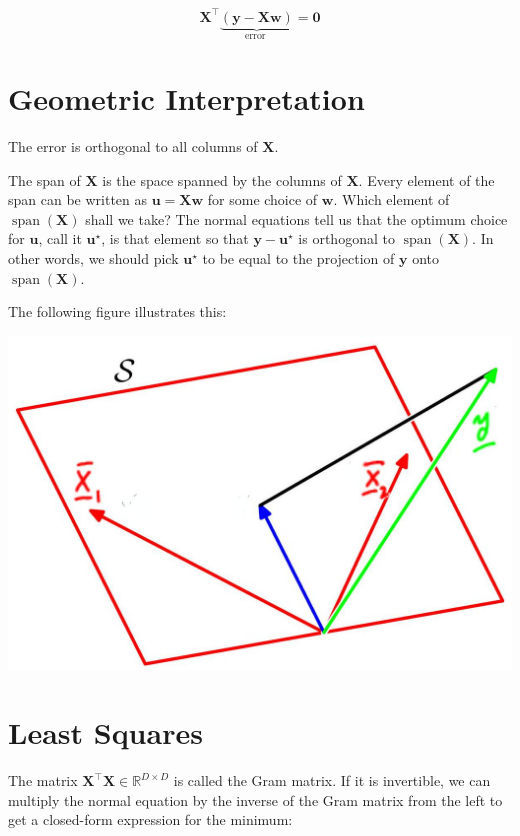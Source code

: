 \documentclass[10pt]{article}
\begin{document}
$$
\mathbf{X}^{\top} \underbrace{(\mathbf{y}-\mathbf{X} \mathbf{w})}_{\text {error }}=\mathbf{0}
$$

\section*{Geometric Interpretation}
The error is orthogonal to all columns of $\mathbf{X}$.

The span of $\mathbf{X}$ is the space spanned by the columns of $\mathbf{X}$. Every element of the span can be written as $\mathbf{u}=\mathbf{X} \mathbf{w}$ for some choice of $\mathbf{w}$. Which element of $\operatorname{span}(\mathbf{X})$ shall we take? The normal equations tell us that the optimum choice for $\mathbf{u}$, call it $\mathbf{u}^{\star}$, is that element so that $\mathbf{y}-\mathbf{u}^{\star}$ is orthogonal to $\operatorname{span}(\mathbf{X})$. In other words, we should pick $\mathbf{u}^{\star}$ to be equal to the projection of $\mathbf{y}$ onto $\operatorname{span}(\mathbf{X})$.

The following figure illustrates this:

\begin{center}
\includegraphics[max width=\textwidth]{2023_12_30_a01c196f804cf1b80331g-6}
\end{center}

\section*{Least Squares}
The matrix $\mathbf{X}^{\top} \mathbf{X} \in \mathbb{R}^{D \times D}$ is called the Gram matrix. If it is invertible, we can multiply the normal equation by the inverse of the Gram matrix from the left to get a closed-form expression for the minimum:
\end{document}
